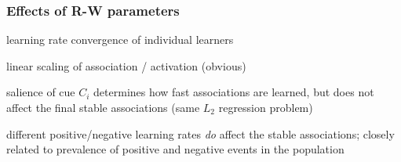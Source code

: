 \begin{frame}
  \frametitle{Effects of R-W parameters}

  \begin{description}
  \item<1->[$\beta > 0$:] learning rate \so convergence of individual learners
  \item<2->[$\lambda \neq 1$:]\gap[.5] linear scaling of association / activation (obvious)
  \item<3->[$\alpha_i\neq 1$:]\gap[.5] salience of cue $C_i$ determines how fast associations are learned, but does not affect the final stable associations (same $L_2$ regression problem)
  \item<4->[$\beta_1 \neq \beta_2$:]\gap[.5] different positive/negative learning rates \emph{do} affect the stable associations; closely related to prevalence of positive and negative events in the population
  \end{description}
\end{frame}

